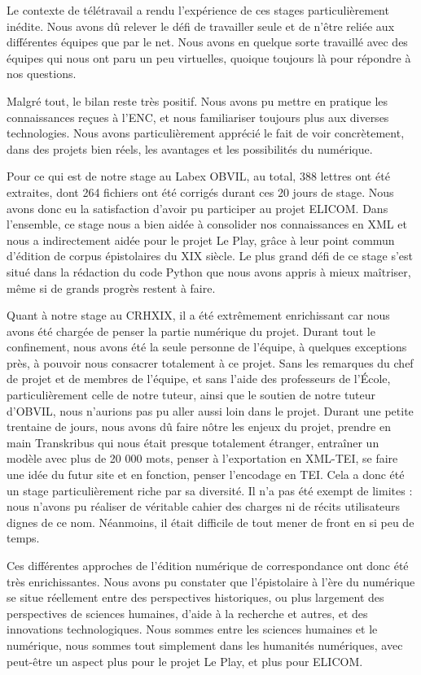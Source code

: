 Le contexte de télétravail a rendu l'expérience de ces stages particulièrement inédite. Nous avons dû relever le défi de travailler seule et de n'être reliée aux différentes équipes que par le net. Nous avons en quelque sorte travaillé avec des équipes qui nous ont paru un peu virtuelles, quoique toujours là pour répondre à nos questions.

Malgré tout, le bilan reste très positif. Nous avons pu mettre en pratique les connaissances reçues à l'ENC, et nous familiariser toujours plus aux diverses technologies. Nous avons particulièrement apprécié le fait de voir concrètement, dans des projets bien réels, les avantages et les possibilités du numérique. 

Pour ce qui est de notre stage au Labex OBVIL, au total, 388 lettres ont été extraites, dont 264 fichiers ont été corrigés durant ces 20 jours de stage. Nous avons donc eu la satisfaction d'avoir pu participer au projet ELICOM.
Dans l’ensemble, ce stage nous a bien aidée à consolider nos connaissances en XML et nous a indirectement aidée pour le projet Le Play, grâce à leur point commun d'édition de corpus épistolaires du XIX siècle. Le plus grand défi de ce stage s'est situé dans la rédaction du code Python que nous avons appris à mieux maîtriser, même si de grands progrès restent à faire.

Quant à notre stage au CRHXIX, il a été extrêmement enrichissant car nous avons été chargée de penser la partie numérique du projet. Durant tout le confinement, nous avons été la seule personne de l'équipe, à quelques exceptions près, à pouvoir nous consacrer totalement à ce projet.
Sans les remarques du chef de projet et de membres de l'équipe, et sans l'aide des professeurs de l'École, particulièrement celle de notre tuteur, ainsi que le soutien de notre tuteur d'OBVIL, nous n'aurions pas pu aller aussi loin dans le projet. Durant une petite trentaine de jours, nous avons dû faire nôtre les enjeux du projet, prendre en main Transkribus qui nous était presque totalement étranger, entraîner un modèle avec plus de 20 000 mots, penser à l'exportation en XML-TEI, se faire une idée du futur site et en fonction, penser l'encodage en TEI. Cela a donc été un stage particulièrement riche par sa diversité. Il n'a pas été exempt de limites : nous n'avons pu réaliser de véritable cahier des charges ni de récits utilisateurs dignes de ce nom. Néanmoins, il était difficile de tout mener de front en si peu de temps.

Ces différentes approches de l'édition numérique de correspondance ont donc été très enrichissantes.
Nous avons pu constater que l’épistolaire à l’ère du numérique se situe réellement entre des perspectives historiques, ou plus largement des perspectives de sciences humaines, d'aide à la recherche et autres, et des innovations technologiques. Nous sommes entre les sciences humaines et le numérique, nous sommes tout simplement dans les humanités numériques, avec peut-être un aspect plus  pour le projet Le Play, et plus  pour ELICOM. 

